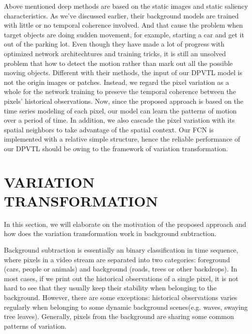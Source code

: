 \documentclass[journal]{IEEEtran}
\begin{document}
Above mentioned deep methods are based on the static images and static saliency characteristics. 
As we've discussed earlier, their background models are trained with little or no temporal coherence involved.
And that cause the problem when target objects are doing sudden movement, for example, starting a car and get it out of the parking lot. 
Even though they have made a lot of progress with optimized network architechtures and training tricks, it is still an unsolved problem that how to detect the motion rather than mark out all the possible moving objects.
Different with their methods, the input of our DPVTL model is not the origin images or patches. Instead, we regard the pixel variation as a whole for the network training to preseve the temporal coherence between the pixels' historical observations.
Now, since the proposed approach is based on the time series modeling of each pixel, our model can learn the patterns of motion over a period of time.
In addition, we also cascade the pixel variation with its spatial neighbors to take advantage of the spatial context. 
Our FCN is implemented with a relative simple structure, hence the reliable performance of our DPVTL should be owing to the framework of variation transformation. 


\section{VARIATION TRANSFORMATION}
\label{sec3}
In this section, we will elaborate on the motivation of the proposed approach and how does the variation transformation work in background subtraction.

Background subtraction is essentially an binary classification in time sequence, where pixels in a video stream are separated into two categories: foreground (cars, people or animals) and background (roads, trees or other backdrops). 
In most cases, if we print out the historical observations of a single pixel, it is not hard to see that they usually keep their stability when belonging to the background. 
However, there are some exceptions: historical observations varies regularly when belonging to some dynamic background scenes(e.g. 
waves, swaying tree leaves). 
Generally, pixels from the background are sharing some common patterns of variation. 
\end{document}

